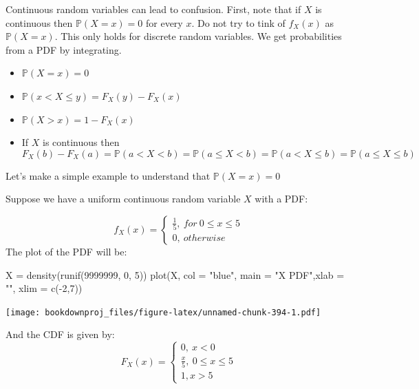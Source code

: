 \documentclass[
]{book}
\newenvironment{Shaded}{\begin{snugshade}}{\end{snugshade}}
\newcommand{\AttributeTok}[1]{\textcolor[rgb]{0.77,0.63,0.00}{#1}}
\newcommand{\DecValTok}[1]{\textcolor[rgb]{0.00,0.00,0.81}{#1}}
\newcommand{\FunctionTok}[1]{\textcolor[rgb]{0.00,0.00,0.00}{#1}}
\newcommand{\NormalTok}[1]{#1}
\newcommand{\OtherTok}[1]{\textcolor[rgb]{0.56,0.35,0.01}{#1}}
\newcommand{\SpecialCharTok}[1]{\textcolor[rgb]{0.00,0.00,0.00}{#1}}
\newcommand{\StringTok}[1]{\textcolor[rgb]{0.31,0.60,0.02}{#1}}
\providecommand{\tightlist}{%
  \setlength{\itemsep}{0pt}\setlength{\parskip}{0pt}}
\theoremstyle{definition}
\theoremstyle{definition}
\theoremstyle{definition}
\theoremstyle{definition}
\theoremstyle{remark}
\begin{document}
Continuous random variables can lead to confusion. First, note that if \(X\) is continuous then \(\mathbb{P}(X=x)=0\) for every \(x\). Do not try to tink of \(f_X(x)\) as \(\mathbb{P}(X=x)\). This only holds for discrete random variables. We get probabilities from a PDF by integrating.

\begin{itemize}
\tightlist
\item
  \(\mathbb{P}(X=x)=0\)
\item
  \(\mathbb{P}(x< X \leq y)= F_X(y)-F_X(x)\)
\item
  \(\mathbb{P}(X>x)=1-F_X(x)\)
\item
  If \(X\) is continuous then
  \[
  F_X(b)-F_X(a)= \mathbb{P}(a<X<b)=\mathbb{P}(a\leq X<b)=\mathbb{P}(a<X\leq b)=\mathbb{P}(a\leq X \leq b)
  \]
\end{itemize}

Let's make a simple example to understand that \(\mathbb{P}(X=x)=0\)

Suppose we have a uniform continuous random variable \(X\) with a PDF:

\[
f_{X}(x)=\begin{cases}
\frac{1}{5},\ for\ 0 \leq x \leq 5\\
0,\ otherwise
\end{cases}
\]
The plot of the PDF will be:

\begin{Shaded}
\begin{Highlighting}[]
\NormalTok{X }\OtherTok{=} \FunctionTok{density}\NormalTok{(}\FunctionTok{runif}\NormalTok{(}\DecValTok{9999999}\NormalTok{, }\DecValTok{0}\NormalTok{, }\DecValTok{5}\NormalTok{))}
\FunctionTok{plot}\NormalTok{(X, }\AttributeTok{col =} \StringTok{"blue"}\NormalTok{, }\AttributeTok{main =} \StringTok{"X PDF"}\NormalTok{,}\AttributeTok{xlab =} \StringTok{""}\NormalTok{, }\AttributeTok{xlim =} \FunctionTok{c}\NormalTok{(}\SpecialCharTok{{-}}\DecValTok{2}\NormalTok{,}\DecValTok{7}\NormalTok{))}
\end{Highlighting}
\end{Shaded}

\texttt{[image: bookdownproj\_files/figure-latex/unnamed-chunk-394-1.pdf]}

And the CDF is given by:
\[
F_{X}(x)=\begin{cases}
0,\ x < 0 \\
\frac{x}{5},\ 0 \leq x \leq 5  \\
1, x > 5
\end{cases}
\]
\end{document}
